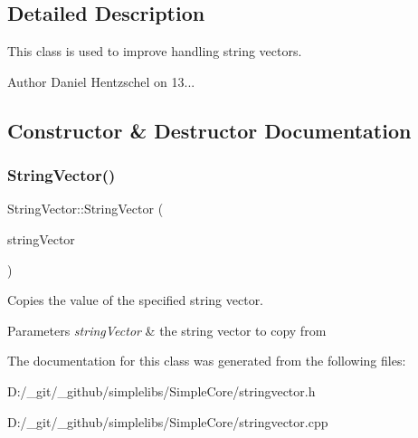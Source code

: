 \subsection{Detailed Description}
This class is used to improve handling string vectors. 

\begin{DoxyAuthor}{Author}
Daniel Hentzschel on 13... 
\end{DoxyAuthor}


\subsection{Constructor \& Destructor Documentation}
\mbox{\label{class_string_vector_ab8b7a61d3ebe3c40e7c080bf68970ad2}} 
\subsubsection{\texorpdfstring{StringVector()}{StringVector()}}
{\footnotesize\ttfamily String\+Vector\+::\+String\+Vector (\begin{DoxyParamCaption}\item[{const \mbox{\hyperlink{class_a_vector}{A\+Vector}}$<$ \mbox{\hyperlink{class_a_string}{A\+String}} $>$ \&}]{string\+Vector }\end{DoxyParamCaption})}



Copies the value of the specified string vector. 


\begin{DoxyParams}{Parameters}
{\em string\+Vector} & the string vector to copy from \\
\hline
\end{DoxyParams}


The documentation for this class was generated from the following files\+:\begin{DoxyCompactItemize}
\item 
D\+:/\+\_\+git/\+\_\+github/simplelibs/\+Simple\+Core/stringvector.\+h\item 
D\+:/\+\_\+git/\+\_\+github/simplelibs/\+Simple\+Core/stringvector.\+cpp\end{DoxyCompactItemize}
